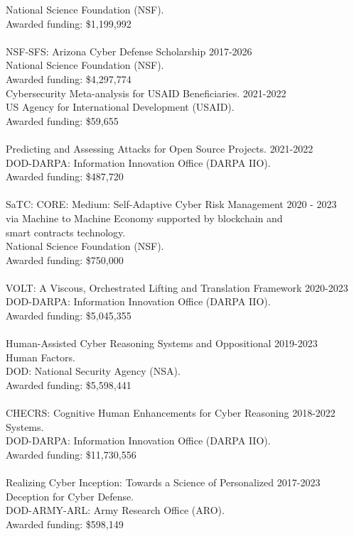 National Science Foundation (NSF). \\
Awarded funding: \$1,199,992 \\
\\
NSF-SFS: Arizona Cyber Defense Scholarship \hfill{2017-2026} \\
National Science Foundation (NSF). \\
Awarded funding: \$4,297,774 \\
Cybersecurity Meta-analysis for USAID Beneficiaries. \hfill{2021-2022} \\
US Agency for International Development (USAID). \\
Awarded funding: \$59,655
\\\\

Predicting and Assessing Attacks for Open Source Projects. \hfill{2021-2022} \\
DOD-DARPA: Information Innovation Office (DARPA IIO). \\
Awarded funding: \$487,720
\\\\

SaTC: CORE: Medium: Self-Adaptive Cyber Risk Management  \hfill{2020 - 2023} \\ 
via Machine to Machine Economy supported by blockchain and \\
smart contracts technology.\\
National Science Foundation (NSF). \\
Awarded funding: \$750,000 
\\\\


VOLT: A Viscous, Orchestrated Lifting and Translation Framework	\hfill{2020-2023} \\
DOD-DARPA: Information Innovation Office (DARPA IIO). \\
Awarded funding: \$5,045,355
\\\\


Human-Assisted Cyber Reasoning Systems and Oppositional \hfill{2019-2023} \\
Human Factors. \\
DOD: National Security Agency (NSA). \\
Awarded funding: \$5,598,441
\\\\

CHECRS: Cognitive Human Enhancements for Cyber Reasoning \hfill{2018-2022} \\
Systems.  \\
DOD-DARPA: Information Innovation Office (DARPA IIO). \\
Awarded funding: \$11,730,556
\\\\

Realizing Cyber Inception: Towards a Science of Personalized \hfill{2017-2023} \\
Deception for Cyber Defense. \\
DOD-ARMY-ARL: Army Research Office (ARO). \\
Awarded funding: \$598,149
